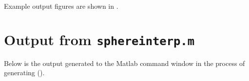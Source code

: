 \documentclass[11pt,titlepage,fleqn]{article}
\begin{document}
Example output figures are shown in .





\appendix
\section{Output from {\tt sphereinterp.m}}
\label{sec:sphereinterp_out}

Below is the output generated to the Matlab command window in the process of generating  ().
\end{document}
